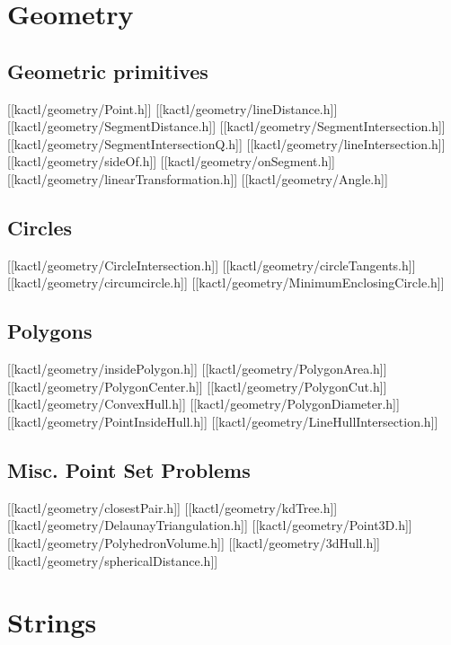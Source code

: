 \chapter{Geometry}

\section{Geometric primitives}

[[kactl/geometry/Point.h]]
[[kactl/geometry/lineDistance.h]]
[[kactl/geometry/SegmentDistance.h]]
[[kactl/geometry/SegmentIntersection.h]]
[[kactl/geometry/SegmentIntersectionQ.h]]
[[kactl/geometry/lineIntersection.h]]
[[kactl/geometry/sideOf.h]]
[[kactl/geometry/onSegment.h]]
[[kactl/geometry/linearTransformation.h]]
[[kactl/geometry/Angle.h]]

\section{Circles}

[[kactl/geometry/CircleIntersection.h]]
[[kactl/geometry/circleTangents.h]]
[[kactl/geometry/circumcircle.h]]
[[kactl/geometry/MinimumEnclosingCircle.h]]

\section{Polygons}

[[kactl/geometry/insidePolygon.h]]
[[kactl/geometry/PolygonArea.h]]
[[kactl/geometry/PolygonCenter.h]]
[[kactl/geometry/PolygonCut.h]]
[[kactl/geometry/ConvexHull.h]]
[[kactl/geometry/PolygonDiameter.h]]
[[kactl/geometry/PointInsideHull.h]]
[[kactl/geometry/LineHullIntersection.h]]

\section{Misc. Point Set Problems}

[[kactl/geometry/closestPair.h]]
[[kactl/geometry/kdTree.h]]
[[kactl/geometry/DelaunayTriangulation.h]]
[[kactl/geometry/Point3D.h]]
[[kactl/geometry/PolyhedronVolume.h]]
[[kactl/geometry/3dHull.h]]
[[kactl/geometry/sphericalDistance.h]]

\chapter{Strings}

